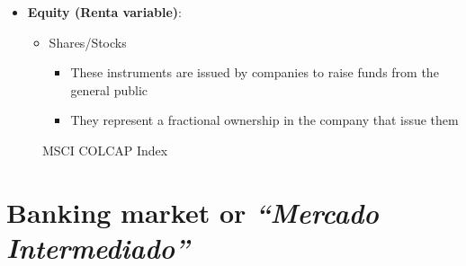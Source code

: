 \documentclass[
  ignorenonframetext,
]{beamer}
\begin{document}
\begin{frame}{}
\label{section-13}
\begin{itemize}
\item
  \textbf{Equity (Renta variable)}:

  \begin{itemize}
  \item
    Shares/Stocks

    \begin{itemize}
    \item
      These instruments are issued by companies to raise funds from the
      general public
    \item
      They represent a fractional ownership in the company that issue
      them
    \end{itemize}
  \end{itemize}
\end{itemize}
\end{frame}

\begin{frame}{}
\label{section-14}
\begin{figure}


\caption{\label{fig-msci-colcap-index-col}MSCI COLCAP Index}

\end{figure}%
\end{frame}

\section{\texorpdfstring{Banking market or \emph{``Mercado
Intermediado''}}{Banking market or ``Mercado Intermediado''}}\label{banking-market-or-mercado-intermediado}
\end{document}
